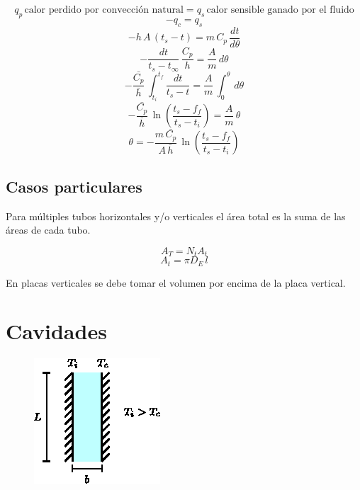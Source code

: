 \begin{equation*}
    q_p\,\text{calor perdido por convección natural} = 
    q_s\,\text{calor sensible ganado por el fluido}
\end{equation*}
\begin{equation*}
    -q_c = q_s
\end{equation*}
\begin{equation*}
    -h\,A\,(t_s-t) = m\,C_p\,\frac{dt}{d\theta}
\end{equation*}
\begin{equation*}
    -\frac{dt}{t_s-t_\infty}\,\frac{C_p}{h} = \frac{A}{m}\,d\theta
\end{equation*}
\begin{equation*}
    -\frac{\bar{C_p}}{\bar{h}}\,\int_{t_i}^{t_f}\frac{dt}{t_s-t} =
        \frac{A}{m}\,\int_0^{\theta}\,d\theta
\end{equation*}
\begin{equation*}
    -\frac{\bar{C_p}}{\bar{h}}\,\ln\left(\frac{t_s-f_f}{t_s-t_i}\right) =
        \frac{A}{m}\,\theta
\end{equation*}
\begin{equation}
    \theta =
    -\frac{m\,\bar{C_p}}{A\,\bar{h}}\,\ln\left(\frac{t_s-f_f}{t_s-t_i}\right)
\end{equation}

\subsection{Casos particulares}

Para múltiples tubos horizontales y/o verticales el área total es la suma de las
áreas de cada tubo.

\begin{equation*}
    A_T = N_t A_t
\end{equation*}
\begin{equation*}
    A_t = \pi D_E\,l
\end{equation*}

En placas verticales se debe tomar el volumen por encima de la placa vertical.

\section{Cavidades}
\begin{figure}[!h]
\centering
\includegraphics[scale=2.00]{figura04_07.eps}
\end{figure}

